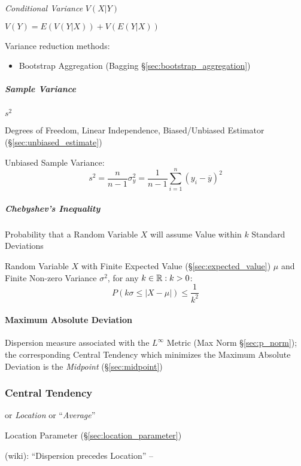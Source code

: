 \emph{Conditional Variance} $V(X|Y)$

$V(Y) = E(V(Y|X)) + V(E(Y|X))$

Variance reduction methods:
\begin{itemize}
  \item Bootstrap Aggregation (Bagging \S\ref{sec:bootstrap_aggregation})
\end{itemize}



\subparagraph{Sample Variance}\label{sec:sample_variance}\hfill

$s^2$

Degrees of Freedom, Linear Independence, Biased/Unbiased Estimator
(\S\ref{sec:unbiased_estimate})

Unbiased Sample Variance:
\[
  s^2 = \frac{n}{n-1}\sigma^2_y =
  \frac{1}{n-1} \sum_{i=1}^n (y_i - \overline{y})^2
\]



\subparagraph{Chebyshev's Inequality}\label{sec:chebyshevs_inequality}\hfill

Probability that a Random Variable $X$ will assume Value within $k$ Standard
Deviations

Random Variable $X$ with Finite Expected Value (\S\ref{sec:expected_value})
$\mu$ and Finite Non-zero Variance $\sigma^2$, for any $k \in \mathbb{R} : k > 0$:
\[
  P(k\sigma \leq |X - \mu|) \leq \frac{1}{k^2}
\]



\paragraph{Maximum Absolute Deviation}
\label{sec:maximum_absolute_deviation}\hfill

Dispersion measure associated with the $L^\infty$ Metric (Max Norm
\S\ref{sec:p_norm}); the corresponding Central Tendency which minimizes the
Maximum Absolute Deviation is the \emph{Midpoint} (\S\ref{sec:midpoint})



\subsubsection{Central Tendency}\label{sec:central_tendency}

or \emph{Location} or ``\emph{Average}''

\fist Location Parameter (\S\ref{sec:location_parameter})

(wiki): ``Dispersion precedes Location'' --

